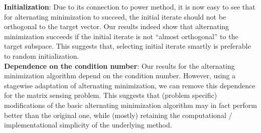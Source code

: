 \documentclass[11pt]{article}
\theoremstyle{plain}
\theoremstyle{definition}
\begin{document}
\begin{itemize}
{\bf Initialization}: Due to its connection  to power method, it is now easy to see  that for alternating minimization to succeed, the initial iterate should not be orthogonal to the target vector. Our results indeed show that alternating minimization  succeeds if the
initial iterate is not ``almost orthogonal'' to the target subspace. This suggests that, selecting initial iterate smartly is preferable to random initialization.\\ %
{\bf Dependence on the condition number}: Our results for the alternating minimization algorithm depend on the condition
number. However, using a stagewise adaptation of alternating minimization, we can remove this dependence
for the matrix sensing problem. This suggests that (problem specific) modifications of the basic alternating minimization
algorithm may in fact perform better than the original one, while (mostly) retaining the computational / implementational
simplicity of the underlying method.
\end{itemize}
\end{document}
